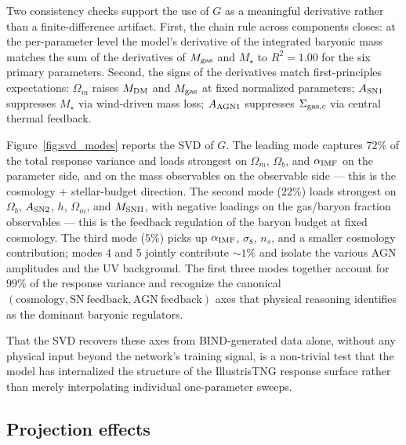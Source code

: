 \documentclass[linenumbers,trackchanges, twocolumn]{aastex701}
\begin{document}
Two consistency checks support the use of $G$ as a meaningful derivative rather than a finite-difference artifact. First, the chain rule across components closes: at the per-parameter level the model's derivative of the integrated baryonic mass matches the sum of the derivatives of $M_{\rm gas}$ and $M_\star$ to $R^2=1.00$ for the six primary parameters. Second, the signs of the derivatives match first-principles expectations: $\Omega_m$ raises $M_{\rm DM}$ and $M_{\rm gas}$ at fixed normalized parameters; $A_{\rm SN1}$ suppresses $M_\star$ via wind-driven mass loss; $A_{\rm AGN1}$ suppresses $\Sigma_{{\rm gas},c}$ via central thermal feedback.

Figure~\ref{fig:svd_modes} reports the SVD of $G$. The leading mode captures $72\%$ of the total response variance and loads strongest on $\Omega_m$, $\Omega_b$, and $\alpha_{\rm IMF}$ on the parameter side, and on the mass observables on the observable side --- this is the cosmology + stellar-budget direction. The second mode ($22\%$) loads strongest on $\Omega_b$, $A_{\rm SN2}$, $h$, $\Omega_m$, and $M_{\rm SNII}$, with negative loadings on the gas/baryon fraction observables --- this is the feedback regulation of the baryon budget at fixed cosmology. The third mode ($5\%$) picks up $\alpha_{\rm IMF}$, $\sigma_8$, $n_s$, and a smaller cosmology contribution; modes 4 and 5 jointly contribute $\sim\!1\%$ and isolate the various AGN amplitudes and the UV background. The first three modes together account for $99\%$ of the response variance and recognize the canonical $(\mathrm{cosmology},\mathrm{SN\ feedback},\mathrm{AGN\ feedback})$ axes that physical reasoning identifies as the dominant baryonic regulators.

That the SVD recovers these axes from \textsc{BIND}-generated data alone, without any physical input beyond the network's training signal, is a non-trivial test that the model has internalized the structure of the IllustrisTNG response surface rather than merely interpolating individual one-parameter sweeps.

\subsection{Projection effects}
\label{subsec:projection}
\end{document}
